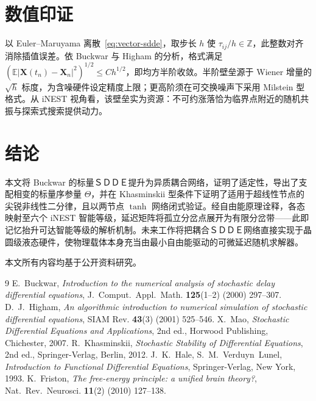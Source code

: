 \documentclass[12pt,a4paper]{ctexart}
\newcommand{\heifont}[1]{{\CJKfamily{yahei}#1}}
\newcommand{\kai}[1]{{\CJKfamily{kai}#1}}
\newcommand{\E}{\mathbb{E}}
\newcommand{\abs}[1]{\left\lvert #1 \right\rvert}
\newcommand{\X}{\mathbf{X}}
\begin{document}
\section{数值印证}\label{sec:numerics}

\hspace{2em}以 Euler–Maruyama 离散~\eqref{eq:vector-sdde}，取步长 $h$ 使 $\tau_{ij}/h\in\mathbb{Z}$，此\kai{整数对齐}消除插值误差。依 Buckwar 与 Higham 的分析，格式满足 $(\E\abs{\X(t_n)-\X_n}^2)^{1/2}\le Ch^{1/2}$，即均方半阶收敛。半阶壁垒源于 Wiener 增量的 $\sqrt{h}$ 标度，为含噪硬件设定精度上限；更高阶须在可交换噪声下采用 Milstein 型格式。从 iNEST 视角看，该壁垒实为资源：不可约涨落恰为临界点附近的随机共振与探索式搜索提供动力。

\section{结论}\label{sec:conclusion}

\hspace{2em}本文将 Buckwar 的标量ＳＤＤＥ提升为异质耦合网络，证明了适定性，导出了支配相变的标量序参量 $\Theta$，并在 Khasminskii 型条件下证明了适用于超线性节点的尖锐非线性二分律，且以两节点 $\tanh$ 网络闭式验证。经自由能原理诠释，各态映射至六个 iNEST 智能等级，延迟矩阵将孤立分岔点展开为有限分岔带——此即记忆抬升可达智能等级的解析机制。未来工作将把耦合ＳＤＤＥ网络直接实现于晶圆级液态硬件，使物理载体本身充当由最小自由能驱动的可微延迟随机求解器。

\medskip
\noindent\heifont{说明：}本文所有内容均基于公开资料研究。

\begin{thebibliography}{9}
 E.~Buckwar, \emph{Introduction to the numerical analysis of stochastic delay differential equations}, J.~Comput.~Appl.~Math. \textbf{125}(1--2) (2000) 297--307.
 D.~J.~Higham, \emph{An algorithmic introduction to numerical simulation of stochastic differential equations}, SIAM Rev. \textbf{43}(3) (2001) 525--546.
 X.~Mao, \emph{Stochastic Differential Equations and Applications}, 2nd ed., Horwood Publishing, Chichester, 2007.
 R.~Khasminskii, \emph{Stochastic Stability of Differential Equations}, 2nd ed., Springer-Verlag, Berlin, 2012.
 J.~K.~Hale, S.~M.~Verduyn~Lunel, \emph{Introduction to Functional Differential Equations}, Springer-Verlag, New York, 1993.
 K.~Friston, \emph{The free-energy principle: a unified brain theory?}, Nat.~Rev.~Neurosci. \textbf{11}(2) (2010) 127--138.
\end{thebibliography}
\end{document}
